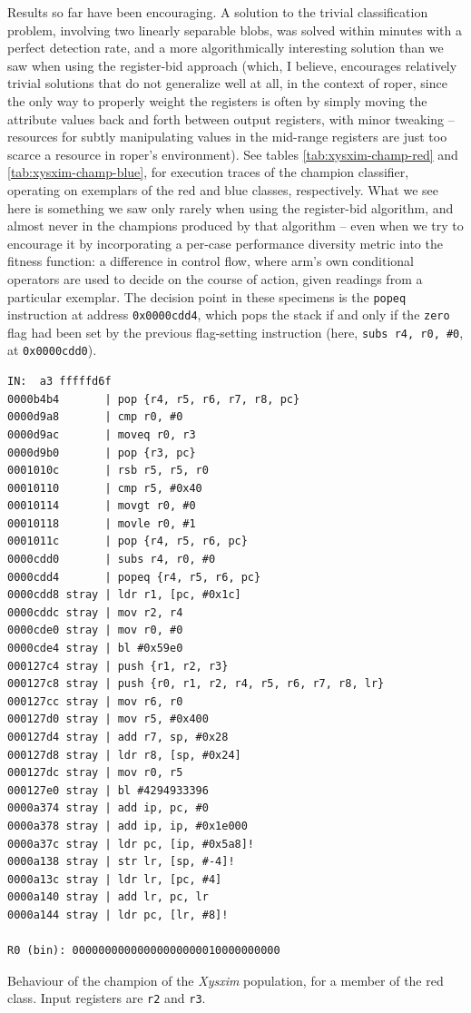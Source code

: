 \documentclass[12pt,glossary]{dalthesis}
\begin{document}
Results so far have been encouraging. A solution to the trivial classification problem, involving
two linearly separable blobs, was solved within minutes with a perfect detection rate, and a
more algorithmically interesting solution than we saw when using the register-bid approach
(which, I believe, encourages relatively trivial solutions that do not generalize well at all, in
the context of \gls{roper}, since the only way to properly weight the registers is often by simply
moving the attribute values back and forth between output registers, with minor tweaking --
resources for subtly manipulating values in the mid-range registers are just too scarce a resource
in \gls{roper}'s environment). See tables \ref{tab:xysxim-champ-red} and \ref{tab:xysxim-champ-blue},
for execution traces of the champion classifier, operating on exemplars of the red and blue classes,
respectively. What we see here is something we saw only rarely when using the register-bid algorithm,
and almost never in the champions produced by that algorithm -- even when we try to encourage it
by incorporating a per-case performance diversity metric into the fitness
function: a difference in control flow, where \gls{arm}'s own conditional
operators are used to decide on the course of action, given readings from a
particular exemplar. The decision point in these specimens is the \texttt{popeq}
instruction at address \texttt{0x0000cdd4}, which pops the stack if and only if the
\texttt{zero} flag had been set by the previous flag-setting instruction (here, \texttt{subs
 r4, r0, \#0}, at \texttt{0x0000cdd0}).

\begin{table}
\begin{lstlisting}
IN:  a3 fffffd6f
0000b4b4       | pop {r4, r5, r6, r7, r8, pc}
0000d9a8       | cmp r0, #0
0000d9ac       | moveq r0, r3
0000d9b0       | pop {r3, pc}
0001010c       | rsb r5, r5, r0
00010110       | cmp r5, #0x40
00010114       | movgt r0, #0
00010118       | movle r0, #1
0001011c       | pop {r4, r5, r6, pc}
0000cdd0       | subs r4, r0, #0
0000cdd4       | popeq {r4, r5, r6, pc}
0000cdd8 stray | ldr r1, [pc, #0x1c]
0000cddc stray | mov r2, r4
0000cde0 stray | mov r0, #0
0000cde4 stray | bl #0x59e0
000127c4 stray | push {r1, r2, r3}
000127c8 stray | push {r0, r1, r2, r4, r5, r6, r7, r8, lr}
000127cc stray | mov r6, r0
000127d0 stray | mov r5, #0x400
000127d4 stray | add r7, sp, #0x28
000127d8 stray | ldr r8, [sp, #0x24]
000127dc stray | mov r0, r5
000127e0 stray | bl #4294933396
0000a374 stray | add ip, pc, #0
0000a378 stray | add ip, ip, #0x1e000
0000a37c stray | ldr pc, [ip, #0x5a8]!
0000a138 stray | str lr, [sp, #-4]!
0000a13c stray | ldr lr, [pc, #4]
0000a140 stray | add lr, pc, lr
0000a144 stray | ldr pc, [lr, #8]!

R0 (bin): 00000000000000000000010000000000
\end{lstlisting}
\caption{Behaviour of the champion of the \emph{Xysxim} population, for a member of the red class. Input registers are \texttt{r2} and \texttt{r3}.}
\label{tab:xysxim-champ-red}
\end{table}
\end{document}
